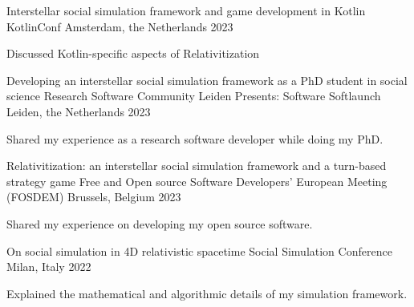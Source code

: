 

\begin{cventries}

  \cventry
    {Interstellar social simulation framework and game development in Kotlin} %
    {KotlinConf} %
    {Amsterdam, the Netherlands} %
    {2023} %
    {
      \begin{cvitems} %
        \item {Discussed Kotlin-specific aspects of Relativitization}
      \end{cvitems}
    }

  \cventry
    {Developing an interstellar social simulation framework as a PhD student in social science} %
    {Research Software Community Leiden Presents: Software Softlaunch} %
    {Leiden, the Netherlands} %
    {2023} %
    {
      \begin{cvitems} %
        \item {Shared my experience as a research software developer while doing my PhD.}
      \end{cvitems}
    }

  \cventry
    {Relativitization: an interstellar social simulation framework and a turn-based strategy game} %
    {Free and Open source Software Developers' European Meeting (FOSDEM)} %
    {Brussels, Belgium} %
    {2023} %
    {
      \begin{cvitems} %
        \item {Shared my experience on developing my open source software.}
      \end{cvitems}
    }

  \cventry
    {On social simulation in 4D relativistic spacetime} %
    {Social Simulation Conference} %
    {Milan, Italy} %
    {2022} %
    {
      \begin{cvitems} %
        \item {Explained the mathematical and algorithmic details of my simulation framework.}
      \end{cvitems}
    }


\end{cventries}
